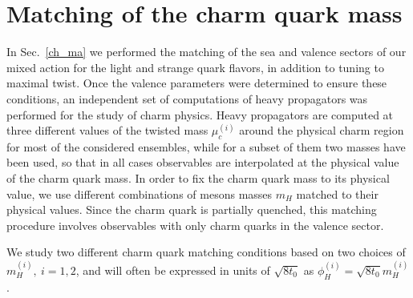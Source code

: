 \section{Matching of the charm quark mass}
\label{sec:matching_charm}

In Sec.~\ref{ch_ma} we performed the matching of the sea and valence sectors of our mixed action for the light and strange quark flavors, in addition to tuning to maximal twist. Once the valence parameters were determined to ensure these conditions, an independent set of computations of heavy propagators was performed for the study of charm physics. Heavy propagators are computed at three different values of the twisted  mass $\mu_c^{(i)}$ around the physical charm region for most of the considered ensembles, while for a subset of them two masses have been used, so that in all cases observables are interpolated at the physical value of the charm quark mass. In order to fix the charm quark mass to its physical value, we use different combinations of mesons masses $m_H$ matched to their physical values. Since the charm quark is partially quenched, this matching procedure involves observables with only charm quarks in the valence sector. 
%

We study two different charm quark matching conditions based on two choices of $m_H^{(i)},~i=1,2$, and will often be expressed in units of $\sqrt{8t_0}$ as $\phi_H^{(i)} = \sqrt{8t_0}m_H^{(i)}$.
%

